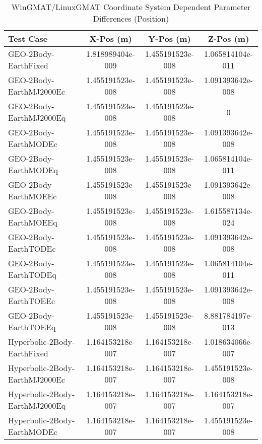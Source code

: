 \begin{table}[htbp!]
\centering
\caption{ WinGMAT/LinuxGMAT Coordinate System Dependent Parameter Differences (Position)}
      \begin{tabular}{lccc}
      \hline\hline
          Test Case & X-Pos (m) & Y-Pos (m) & Z-Pos (m) \\
         \hline
         GEO-2Body-EarthFixed & 1.818989404e-009 & 1.455191523e-008 & 1.065814104e-011 \\
         GEO-2Body-EarthMJ2000Ec & 1.455191523e-008 & 1.455191523e-008 & 1.091393642e-008 \\
         GEO-2Body-EarthMJ2000Eq & 1.455191523e-008 & 1.455191523e-008 & 0 \\
         GEO-2Body-EarthMODEc & 1.455191523e-008 & 1.455191523e-008 & 1.091393642e-008 \\
         GEO-2Body-EarthMODEq & 1.455191523e-008 & 1.455191523e-008 & 1.065814104e-011 \\
         GEO-2Body-EarthMOEEc & 1.455191523e-008 & 1.455191523e-008 & 1.091393642e-008 \\
         GEO-2Body-EarthMOEEq & 1.455191523e-008 & 1.455191523e-008 & 1.615587134e-024 \\
         GEO-2Body-EarthTODEc & 1.455191523e-008 & 1.455191523e-008 & 1.091393642e-008 \\
         GEO-2Body-EarthTODEq & 1.455191523e-008 & 1.455191523e-008 & 1.065814104e-011 \\
         GEO-2Body-EarthTOEEc & 1.455191523e-008 & 1.455191523e-008 & 1.091393642e-008 \\
         GEO-2Body-EarthTOEEq & 1.455191523e-008 & 1.455191523e-008 & 8.881784197e-013 \\
         Hyperbolic-2Body-EarthFixed & 1.164153218e-007 & 1.164153218e-007 & 1.018634066e-007 \\
         Hyperbolic-2Body-EarthMJ2000Ec & 1.164153218e-007 & 1.164153218e-007 & 1.455191523e-008 \\
         Hyperbolic-2Body-EarthMJ2000Eq & 1.164153218e-007 & 1.164153218e-007 & 1.164153218e-007 \\
         Hyperbolic-2Body-EarthMODEc & 1.164153218e-007 & 1.164153218e-007 & 1.455191523e-008 \\

\end{tabular}
\end{table}
